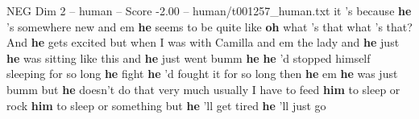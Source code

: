 \begin{textsample}{NEG Dim 2 – human – Score -2.00 – human/t001257\_human.txt}  \label{ex:f2_neg_017}
it 's because \textbf{he} 's somewhere new and em \textbf{he} seems to be quite like \textbf{oh} what 's that what 's that?
And \textbf{he} gets excited but when I was with Camilla and em the lady and \textbf{he} just \textbf{he} was sitting like this and \textbf{he} just went bumm \textbf{he} \textbf{he} 'd stopped himself sleeping for so long \textbf{he} fight \textbf{he} 'd fought it for so long then \textbf{he} em \textbf{he} was just bumm but \textbf{he} doesn't do that very much usually I have to feed \textbf{him} to sleep or rock \textbf{him} to sleep or something but \textbf{he} 'll get tired \textbf{he} 'll just go

\end{textsample}
